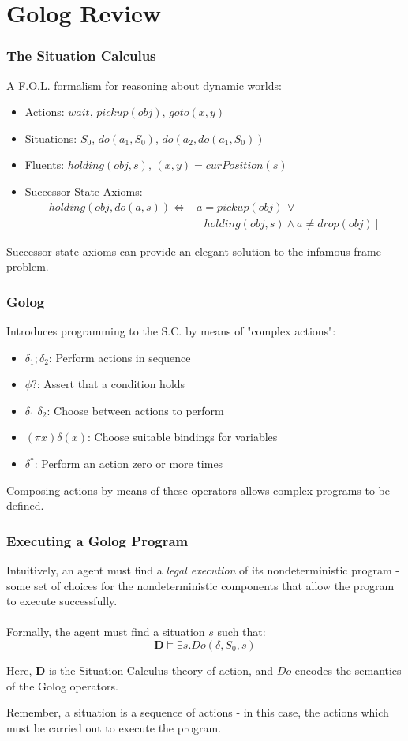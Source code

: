 \documentclass{beamer}
\begin{document}
\section{Golog Review}

\begin{frame}
\frametitle{The Situation Calculus}

A F.O.L. formalism for reasoning about dynamic worlds:

\begin{itemize}
\pause
\item Actions: $wait$, $pickup(obj)$, $goto(x,y)$
\pause
\item Situations: $S_{0}$, $do(a_{1},S_{0})$, $do(a_{2},do(a_{1},S_{0}))$
\pause
\item Fluents: $holding(obj,s)$, $(x,y)=curPosition(s)$
\pause
\item Successor State Axioms:\[
\begin{array}{cc}
holding(obj,do(a,s))\iff & a=pickup(obj)\,\vee\\
 & \left[holding(obj,s)\wedge a\neq drop(obj)\right]\end{array}\]
\end{itemize}
Successor state axioms can provide an elegant solution to the infamous
frame problem.

\end{frame}

\begin{frame}
\frametitle{Golog}
Introduces programming to the S.C. by means of "complex actions":
\begin{itemize}
  \pause
  \item $\delta_1;\delta_2$: Perform actions in sequence
  \pause
  \item $\phi?$: Assert that a condition holds
  \pause
  \item $\delta_1|\delta_2$: Choose between actions to perform
  \pause
  \item $(\pi x)\delta(x)$: Choose suitable bindings for variables
  \pause
  \item $\delta^*$: Perform an action zero or more times
  \pause
\end{itemize}
Composing actions by means of these operators allows complex programs
to be defined.
\end{frame}

\begin{frame}
\frametitle{Executing a Golog Program}
Intuitively, an agent must find a \emph{legal execution} of its nondeterministic
program - some set of choices for the nondeterministic components that allow
the program to execute successfully.\\
\ \\
Formally, the agent must find a situation $s$ such that:\[
\mathbf{D} \models \exists s . Do(\delta,S_0,s)\]

Here, $\mathbf{D}$ is the Situation Calculus theory of action, and $Do$
encodes the semantics of the Golog operators.

Remember, a situation is a sequence of actions - in this case, the actions which must be carried out to execute the program.
\end{frame}
\end{document}
